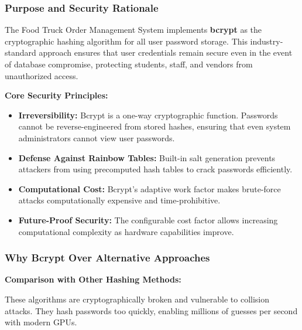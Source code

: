 \documentclass[12pt,a4paper]{article}
\begin{document}
\begin{tcolorbox}[colback=primaryblue!5, colframe=primaryblue, boxrule=1pt, arc=3pt, left=10pt, right=10pt, top=8pt, bottom=8pt]

\subsubsection{Purpose and Security Rationale}

The Food Truck Order Management System implements \textbf{bcrypt} as the cryptographic hashing algorithm for all user password storage. This industry-standard approach ensures that user credentials remain secure even in the event of database compromise, protecting students, staff, and vendors from unauthorized access.

\vspace{0.5em}

\textbf{Core Security Principles:}

\begin{itemize}[leftmargin=2em, itemsep=6pt]
    \item \textbf{Irreversibility:} Bcrypt is a one-way cryptographic function. Passwords cannot be reverse-engineered from stored hashes, ensuring that even system administrators cannot view user passwords.
    \item \textbf{Defense Against Rainbow Tables:} Built-in salt generation prevents attackers from using precomputed hash tables to crack passwords efficiently.
    \item \textbf{Computational Cost:} Bcrypt's adaptive work factor makes brute-force attacks computationally expensive and time-prohibitive.
    \item \textbf{Future-Proof Security:} The configurable cost factor allows increasing computational complexity as hardware capabilities improve.
\end{itemize}

\subsubsection{Why Bcrypt Over Alternative Approaches}

\textbf{Comparison with Other Hashing Methods:}

\begin{description}[leftmargin=2em, itemsep=8pt, style=nextline]
    \item[\textbf{MD5 and SHA-1 (Rejected):}] These algorithms are cryptographically broken and vulnerable to collision attacks. They hash passwords too quickly, enabling millions of guesses per second with modern GPUs.
    

\end{description}
\end{tcolorbox}
\end{document}
